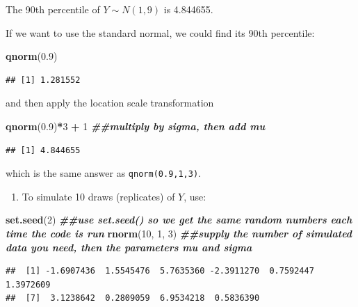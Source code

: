 \documentclass[
]{book}
\newenvironment{Shaded}{\begin{snugshade}}{\end{snugshade}}
\newcommand{\DecValTok}[1]{\textcolor[rgb]{0.00,0.00,0.81}{#1}}
\newcommand{\DocumentationTok}[1]{\textcolor[rgb]{0.56,0.35,0.01}{\textbf{\textit{#1}}}}
\newcommand{\FloatTok}[1]{\textcolor[rgb]{0.00,0.00,0.81}{#1}}
\newcommand{\FunctionTok}[1]{\textcolor[rgb]{0.13,0.29,0.53}{\textbf{#1}}}
\newcommand{\NormalTok}[1]{#1}
\newcommand{\SpecialCharTok}[1]{\textcolor[rgb]{0.81,0.36,0.00}{\textbf{#1}}}
\providecommand{\tightlist}{%
  \setlength{\itemsep}{0pt}\setlength{\parskip}{0pt}}
\begin{document}
The 90th percentile of \(Y \sim N(1,9)\) is 4.844655.

If we want to use the standard normal, we could find its 90th percentile:

\begin{Shaded}
\begin{Highlighting}[]
\FunctionTok{qnorm}\NormalTok{(}\FloatTok{0.9}\NormalTok{)}
\end{Highlighting}
\end{Shaded}

\begin{verbatim}
## [1] 1.281552
\end{verbatim}

and then apply the location scale transformation

\begin{Shaded}
\begin{Highlighting}[]
\FunctionTok{qnorm}\NormalTok{(}\FloatTok{0.9}\NormalTok{)}\SpecialCharTok{*}\DecValTok{3} \SpecialCharTok{+} \DecValTok{1} \DocumentationTok{\#\#multiply by sigma, then add mu}
\end{Highlighting}
\end{Shaded}

\begin{verbatim}
## [1] 4.844655
\end{verbatim}

which is the same answer as \texttt{qnorm(0.9,1,3)}.

\begin{enumerate}
\def\labelenumi{\arabic{enumi}.}
\setcounter{enumi}{3}
\tightlist
\item
  To simulate 10 draws (replicates) of \(Y\), use:
\end{enumerate}

\begin{Shaded}
\begin{Highlighting}[]
\FunctionTok{set.seed}\NormalTok{(}\DecValTok{2}\NormalTok{) }\DocumentationTok{\#\#use set.seed() so we get the same random numbers each time the code is run}
\FunctionTok{rnorm}\NormalTok{(}\DecValTok{10}\NormalTok{, }\DecValTok{1}\NormalTok{, }\DecValTok{3}\NormalTok{) }\DocumentationTok{\#\#supply the number of simulated data you need, then the parameters mu and sigma}
\end{Highlighting}
\end{Shaded}

\begin{verbatim}
##  [1] -1.6907436  1.5545476  5.7635360 -2.3911270  0.7592447  1.3972609
##  [7]  3.1238642  0.2809059  6.9534218  0.5836390
\end{verbatim}
\end{document}
